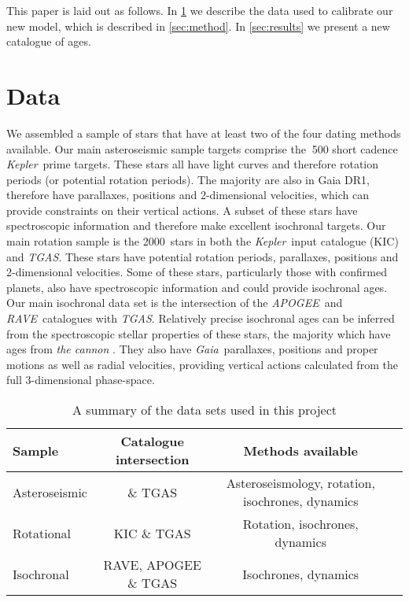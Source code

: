 \documentclass[useAMS, usenatbib, preprint, 12pt]{aastex}
\newcommand{\Kepler}{{\it Kepler}}
\newcommand{\kepler}{\Kepler}
\newcommand{\TGAS}{{\it TGAS}}
\newcommand{\tgas}{{\it TGAS}}
\newcommand{\apogee}{{\it APOGEE}}
\newcommand{\gaia}{{\it Gaia}}
\newcommand{\rave}{{\it RAVE}}
\newcommand{\nkictgas}{2000}
\begin{document}
This paper is laid out as follows.
In \textsection \ref{sec:data} we describe the data used to calibrate our new
model, which is described in \textsection \ref{sec:method}.
In \textsection \ref{sec:results} we present a new catalogue of ages.

\section{Data}
\label{sec:data}
We assembled a sample of stars that have at least two of the four dating
methods available.
Our main asteroseismic sample targets comprise the $~$500 short cadence
\kepler\ prime targets.
These stars all have light curves and therefore rotation periods (or potential
rotation periods).
The majority are also in Gaia DR1, therefore have parallaxes, positions and
2-dimensional velocities, which can provide constraints on their vertical
actions.
A subset of these stars have spectroscopic information and therefore make
excellent isochronal targets.
Our main rotation sample is the \nkictgas\ stars in both the \kepler\ input
catalogue (KIC) and \TGAS.
These stars have potential rotation periods, parallaxes, positions and
2-dimensional velocities.
Some of these stars, particularly those with confirmed planets, also have
spectroscopic information and could provide isochronal ages.
Our main isochronal data set is the intersection of the \apogee\ and \rave\
catalogues with \tgas.
Relatively precise isochronal ages can be inferred from the spectroscopic
stellar properties of these stars, the majority which have ages from {\it the
cannon} \citep{Ness2015, Casey2016}.
They also have \gaia\ parallaxes, positions and proper motions as well as
radial velocities, providing vertical actions calculated from the full
3-dimensional phase-space.

\begin{landscape}
\begin{table}
\begin{center}
\caption{A summary of the data sets used in this project}
\begin{tabular}{lccc}
    Sample & Catalogue intersection &  Methods available \\
    \hline
    Asteroseismic & \citet{Chaplin2014} \& TGAS & Asteroseismology, rotation,
    isochrones, dynamics \\
    Rotational & KIC \& TGAS & Rotation, isochrones, dynamics \\
    Isochronal & RAVE, APOGEE \& TGAS & Isochrones, dynamics \\
\end{tabular}
\end{center}
\end{table}
\label{tab:data}
\end{landscape}
\end{document}
